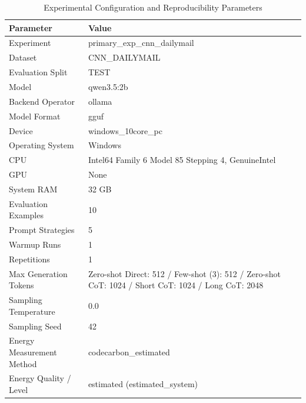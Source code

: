 \begin{table}
\caption{Experimental Configuration and Reproducibility Parameters}
\label{tab:experimental_configuration}
\begin{tabular}{ll}
\toprule
Parameter & Value \\
\midrule
Experiment & primary\_exp\_cnn\_dailymail \\
Dataset & CNN\_DAILYMAIL \\
Evaluation Split & TEST \\
Model & qwen3.5:2b \\
Backend Operator & ollama \\
Model Format & gguf \\
Device & windows\_10core\_pc \\
Operating System & Windows \\
CPU & Intel64 Family 6 Model 85 Stepping 4, GenuineIntel \\
GPU & None \\
System RAM & 32 GB \\
Evaluation Examples & 10 \\
Prompt Strategies & 5 \\
Warmup Runs & 1 \\
Repetitions & 1 \\
Max Generation Tokens & Zero-shot Direct: 512 / Few-shot (3): 512 / Zero-shot CoT: 1024 / Short CoT: 1024 / Long CoT: 2048 \\
Sampling Temperature & 0.0 \\
Sampling Seed & 42 \\
Energy Measurement Method & codecarbon\_estimated \\
Energy Quality / Level & estimated (estimated\_system) \\
\bottomrule
\end{tabular}
\end{table}
